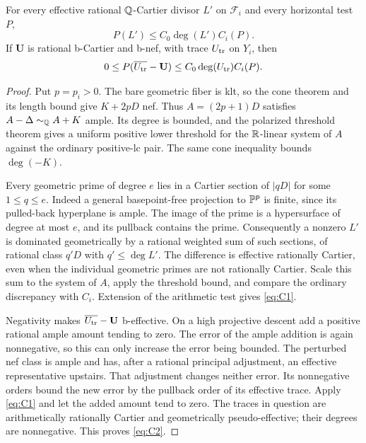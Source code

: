 \begin{lemma}\label{b:horizontal-estimates}
For every effective rational \(\mathbb Q\)-Cartier divisor \(L'\) on
\(\mathcal F_i\) and every horizontal test \(P\),
\begin{equation}\label{eq:C1}
              P(L')\le C_0\deg(L')C_i(P).
\end{equation}
If \(\mathbf U\) is rational b-Cartier and b-nef, with trace
\(U_{\rm tr}\) on \(Y_i\), then
\begin{equation}\label{eq:C2}
 0\le P(\overline{U_{\rm tr}}-\mathbf U)
                  \le C_0\deg(U_{\rm tr})C_i(P).
\end{equation}
\end{lemma}

\begin{proof}
Put \(p=p_i>0\). The bare geometric fiber is klt, so the cone
theorem and its length bound \cite[Theorem~1.1(5)]{FujinoFundamental}
give \(K+2pD\) nef. Thus \(A=(2p+1)D\) satisfies
\(A-\Delta\sim_\mathbb Q A+K\) ample. Its degree is bounded, and the
polarized threshold theorem \cite[Theorem 1.8]{BirkarBAB}
gives a uniform positive lower threshold for the
\(\mathbb R\)-linear system of \(A\) against the ordinary positive-lc pair.
The same cone inequality bounds \(\deg(-K)\).

Every geometric prime of degree \(e\) lies in a Cartier section of
\(|qD|\) for some \(1\le q\le e\). Indeed a general basepoint-free
projection to \(\mathbb P^p\) is finite, since its pulled-back hyperplane
is ample. The image of the prime is a hypersurface of degree at
most \(e\), and its pullback contains the prime. Consequently a
nonzero \(L'\) is dominated geometrically by a rational weighted
sum of such sections, of rational class \(q'D\) with
\(q'\le\deg L'\). The difference is effective rationally Cartier,
even when the individual geometric primes are not rationally
Cartier. Scale this sum to the system of \(A\), apply the threshold
bound, and compare the ordinary discrepancy with \(C_i\).
Extension of the arithmetic test gives \eqref{eq:C1}.

Negativity makes \(\overline{U_{\rm tr}}-\mathbf U\) b-effective.
On a high projective descent add a positive rational ample amount
tending to zero. The error of the ample addition is again
nonnegative, so this can only increase the error being bounded.
The perturbed nef class is ample and has, after a rational
principal adjustment, an effective representative upstairs.
That adjustment changes neither error. Its nonnegative orders
bound the new error by the pullback order of its effective trace.
Apply \eqref{eq:C1} and let the added amount tend to zero.
The traces in question are arithmetically rationally Cartier
and geometrically pseudo-effective; their degrees are
nonnegative. This proves \eqref{eq:C2}.
\end{proof}

